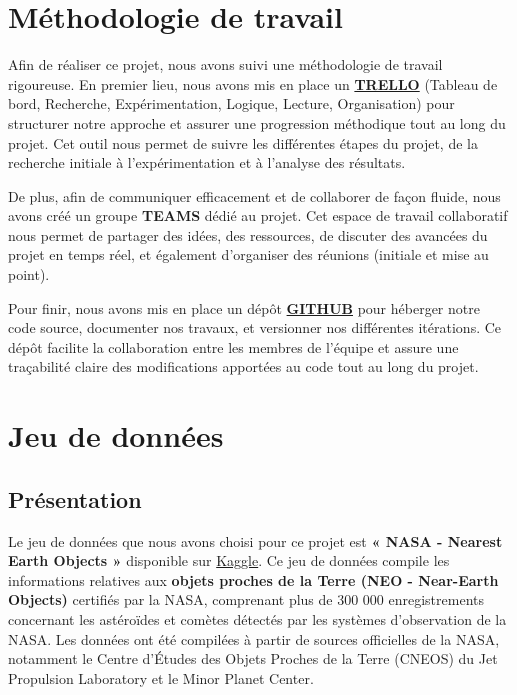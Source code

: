 \documentclass[11pt]{article}
\begin{document}
\section{Méthodologie de travail}\label{muxe9thodologie-de-travail}

Afin de réaliser ce projet, nous avons suivi une méthodologie de travail
rigoureuse. En premier lieu, nous avons mis en place un
\href{https://trello.com/invite/b/693b2c8476833a31b8d5fda8/ATTI44ac34d643ef44d182e37f18d0572d93F5289FD2/ift712project}{\textbf{TRELLO}}
(Tableau de bord, Recherche, Expérimentation, Logique, Lecture,
Organisation) pour structurer notre approche et assurer une progression
méthodique tout au long du projet. Cet outil nous permet de suivre les
différentes étapes du projet, de la recherche initiale à
l'expérimentation et à l'analyse des résultats.

De plus, afin de communiquer efficacement et de collaborer de façon
fluide, nous avons créé un groupe \textbf{TEAMS} dédié au projet. Cet
espace de travail collaboratif nous permet de partager des idées, des
ressources, de discuter des avancées du projet en temps réel, et
également d'organiser des réunions (initiale et mise au point).

Pour finir, nous avons mis en place un dépôt
\href{https://github.com/RobinBecard/IFT712_Project}{\textbf{GITHUB}}
pour héberger notre code source, documenter nos travaux, et versionner
nos différentes itérations. Ce dépôt facilite la collaboration entre les
membres de l'équipe et assure une traçabilité claire des modifications
apportées au code tout au long du projet.

\section{Jeu de données}\label{jeu-de-donnuxe9es}

\subsection{Présentation}\label{pruxe9sentation}

Le jeu de données que nous avons choisi pour ce projet est \textbf{«
  NASA - Nearest Earth Objects »} disponible sur
\href{https://www.kaggle.com/datasets/sameepvani/nasa-nearest-earth-objects}{Kaggle}.
Ce jeu de données compile les informations relatives aux \textbf{objets
  proches de la Terre (NEO - Near-Earth Objects)} certifiés par la NASA,
comprenant plus de 300 000 enregistrements concernant les astéroïdes et
comètes détectés par les systèmes d'observation de la NASA. Les données
ont été compilées à partir de sources officielles de la NASA, notamment
le Centre d'Études des Objets Proches de la Terre (CNEOS) du Jet
Propulsion Laboratory et le Minor Planet Center.
\end{document}
